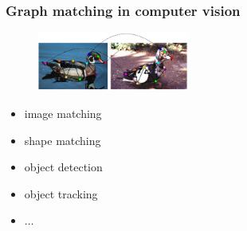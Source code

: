 \documentclass[hyperref={pdfpagelabels=false}]{beamer}
\begin{document}
\begin{frame}
\frametitle{Graph matching in computer vision}
\begin{figure}[t]
    \centering
    \includegraphics[width=5cm]{fig/ducks_12.pdf}
\end{figure}
\begin{itemize}
\item image matching
\item shape matching
\item object detection
\item object tracking
\item $\dots$
\end{itemize}
\end{frame}
\end{document}
